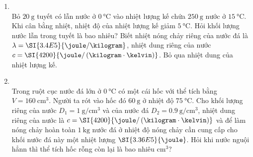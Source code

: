 \begin{enumerate}[label=\bfseries Câu \arabic*:, leftmargin=1.7cm]
\item {}\\
Bỏ $\SI{20}{\gram}$ tuyết có lẫn nước ở $\SI{0}{\celsius}$ vào nhiệt lượng kế chứa $\SI{250}{\gram}$ nước ở $\SI{15}{\celsius}$. Khi cân bằng nhiệt, nhiệt độ của nhiệt lượng kế giảm $\SI{5}{\celsius}$. Hỏi khối lượng nước lẫn trong tuyết là bao nhiêu? Biết nhiệt nóng chảy riêng của nước đá là $\lambda=\SI{3.4E5}{\joule/\kilogram}$, nhiệt dung riêng của nước $c=\SI{4200}{\joule/\left(\kilogram\cdot\kelvin\right)}$. Bỏ qua nhiệt dung của nhiệt lượng kế.
\item {}\\
Trong ruột cục nước đá lớn ở $\SI{0}{\celsius}$ có một cái hốc với thể tích bằng $V=\SI{160}{\centi\meter^3}$. Người ta rót vào hốc đó $\SI{60}{\gram}$ ở nhiệt độ $\SI{75}{\celsius}$. Cho khối lượng riêng của nước $D_1=\SI{1}{\gram/\centi\meter^3}$ và của nước đá $D_2=\SI{0.9}{\gram/\centi\meter^3}$, nhiệt dung riêng của nước là $c=\SI{4200}{\joule/\left(\kilogram\cdot\kelvin\right)}$ và để làm nóng chảy hoàn toàn $\SI{1}{\kilogram}$ nước đá ở nhiệt độ nóng chảy cần cung cấp cho khối nước đá này một nhiệt lượng $\SI{3.36E5}{\joule}$. Hỏi khi nước nguội hẳnn thì thể tích hốc rỗng còn lại là bao nhiêu $\si{\centi\meter^3}$?



\end{enumerate}